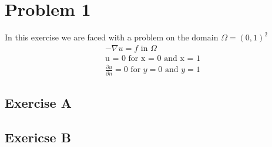 \documentclass[a4paper,norsk]{article}
\begin{document}
\maketitle

\section*{Problem 1}
In this exercise we are faced with a problem on the domain $\Omega = (0,1)^2$
\begin{align}
-\nabla u = f\text{ in } \Omega \\
\text{u = 0 for x = 0 and x = 1} \\
\frac{\partial u}{\partial n} = 0 \text{ for } y = 0 \text{ and } y = 1
\end{align}

\subsection*{Exercise A}

\subsection*{Exericse B}
\end{document}
